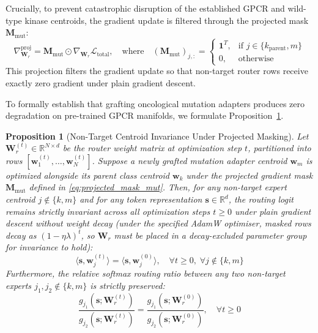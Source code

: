\documentclass{article}
\newtheorem{proposition}[theorem]{Proposition}
\theoremstyle{definition}
\begin{document}
Crucially, to prevent catastrophic disruption of the established GPCR and wild-type kinase centroids, the gradient update is filtered through the projected mask $\mathbf{M}_{\text{mut}}$:
\begin{equation}
\nabla_{\mathbf{W}_r}^{\text{proj}} = \mathbf{M}_{\text{mut}} \odot \nabla_{\mathbf{W}_r} \mathcal{L}_{\text{total}}, \quad \text{where} \quad (\mathbf{M}_{\text{mut}})_{j,:} = 
\begin{cases}
\mathbf{1}^T, & \text{if } j \in \{k_{\text{parent}}, m\} \\
0, & \text{otherwise}
\end{cases}
\label{eq:projected_mask_mut}
\end{equation}
This projection filters the gradient update so that non-target router rows receive exactly zero gradient under plain gradient descent.

To formally establish that grafting oncological mutation adapters produces zero degradation on pre-trained GPCR manifolds, we formulate Proposition~\ref{prop:mutation_invariance}.

\begin{proposition}[Non-Target Centroid Invariance Under Projected Masking]
\label{prop:mutation_invariance}
Let $\mathbf{W}_r^{(t)} \in \mathbb{R}^{N \times d}$ be the router weight matrix at optimization step $t$, partitioned into rows $[\mathbf{w}_1^{(t)}, \dots, \mathbf{w}_N^{(t)}]$. Suppose a newly grafted mutation adapter centroid $\mathbf{w}_m$ is optimized alongside its parent class centroid $\mathbf{w}_k$ under the projected gradient mask $\mathbf{M}_{\mathrm{mut}}$ defined in \cref{eq:projected_mask_mut}. Then, for any non-target expert centroid $j \notin \{k, m\}$ and for any token representation $\mathbf{s} \in \mathbb{R}^d$, the routing logit remains strictly invariant across all optimization steps $t \ge 0$ under plain gradient descent without weight decay (under the specified AdamW optimiser, masked rows decay as $(1-\eta\lambda)^t$, so $\mathbf{W}_r$ must be placed in a decay-excluded parameter group for invariance to hold):
\begin{equation}
\langle \mathbf{s}, \mathbf{w}_j^{(t)} \rangle = \langle \mathbf{s}, \mathbf{w}_j^{(0)} \rangle, \quad \forall t \ge 0, \; \forall j \notin \{k, m\}
\label{eq:logit_invariance}
\end{equation}
Furthermore, the relative softmax routing ratio between any two non-target experts $j_1, j_2 \notin \{k, m\}$ is strictly preserved:
\begin{equation}
\frac{g_{j_1}(\mathbf{s}; \mathbf{W}_r^{(t)})}{g_{j_2}(\mathbf{s}; \mathbf{W}_r^{(t)})} = \frac{g_{j_1}(\mathbf{s}; \mathbf{W}_r^{(0)})}{g_{j_2}(\mathbf{s}; \mathbf{W}_r^{(0)})}, \quad \forall t \ge 0
\label{eq:ratio_invariance}
\end{equation}
\end{proposition}
\end{document}
